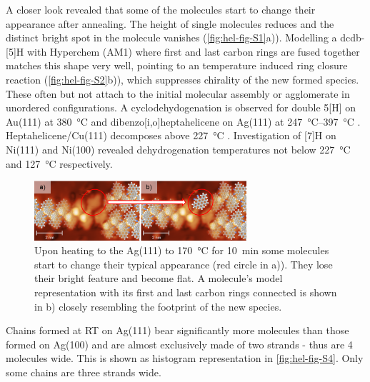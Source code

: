 A closer look revealed that some of the molecules start to change their appearance after annealing.  The height of single molecules reduces and the distinct bright spot in the molecule vanishes (\autoref{fig:hel-fig-S1}a)). Modelling a dcdb-[5]H with Hyperchem (AM1) where first and last carbon rings are fused together matches this shape very well, pointing to an temperature induced ring closure reaction (\autoref{fig:hel-fig-S2}b)), which suppresses chirality of the new formed species. These often but not attach to the initial molecular assembly or agglomerate in unordered configurations. A cyclodehydogenation is observed for double 5[H] on Au(111) at \SI{380}{\celsius} \cite{Wang_Heteroatom-doped_2017} and dibenzo[i,o]heptahelicene on Ag(111) at \SIrange{247}{397}{\celsius} \cite{Stetsovych_helical_2016}. Heptahelicene/Cu(111) decomposes above \SI{227}{\celsius} \cite{Ernst_two-dimensional_2001}. Investigation of [7]H on Ni(111) and Ni(100) revealed dehydrogenation temperatures not below \SI{227}{\celsius} and \SI{127}{\celsius} respectively.\cite{Ernst_Adsorption_2003}

\begin{figure} \centering
	\includegraphics[width=0.7\textwidth]{./images/paper/helicene/fig-S2}
	\caption{Upon heating to the Ag(111) to \SI{170}{\celsius} for \SI{10}{\minute} some molecules start to change their typical appearance (red circle in a)). They lose their bright feature and become flat. A molecule’s model representation with its first and last carbon rings connected is shown in b) closely resembling the footprint of the new species.}
	\label{fig:hel-fig-S2}
\end{figure}

Chains formed at RT on Ag(111) bear significantly more molecules than those formed on Ag(100) and are almost exclusively made of two strands - thus are 4 molecules wide. This is shown as histogram representation in \autoref{fig:hel-fig-S4}. Only some chains are three strands wide.

